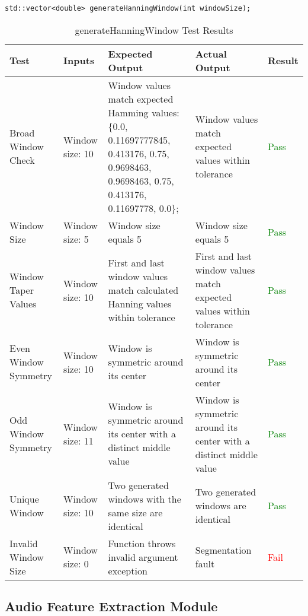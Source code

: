 \documentclass[12pt, titlepage]{article}
\begin{document}
\noindent\texttt{std::vector<double> generateHanningWindow(int windowSize);}\\
\begin{longtable}{|L{3cm}|L{3cm}|L{2.5cm}|L{2.5cm}|l|}
  \caption{generateHanningWindow Test Results} \\
  \hline
  \textbf{Test} & \textbf{Inputs} & \textbf{Expected Output} & \textbf{Actual Output} & \textbf{Result} \\
  \hline
  Broad Window Check &
    Window size: 10 &
    Window values match expected Hamming values: \{0.0, 0.11697777845, 0.413176, 0.75, 0.9698463, 
    0.9698463, 0.75, 0.413176, 0.11697778, 0.0\}; &
    Window values match expected values within tolerance &
    \textcolor{green}{Pass} \\
  \hline
  Window Size &
    Window size: 5 &
    Window size equals 5 &
    Window size equals 5 &
    \textcolor{green}{Pass} \\
  \hline
  Window Taper Values &
    Window size: 10 &
    First and last window values match calculated Hanning values within tolerance &
    First and last window values match expected values within tolerance &
    \textcolor{green}{Pass} \\
  \hline
  Even Window Symmetry &
    Window size: 10 &
    Window is symmetric around its center &
    Window is symmetric around its center &
    \textcolor{green}{Pass} \\
  \hline
  Odd Window Symmetry &
    Window size: 11 &
    Window is symmetric around its center with a distinct middle value &
    Window is symmetric around its center with a distinct middle value &
    \textcolor{green}{Pass} \\
  \hline
  Unique Window &
    Window size: 10 &
    Two generated windows with the same size are identical &
    Two generated windows are identical &
    \textcolor{green}{Pass} \\
  \hline
  Invalid Window Size &
    Window size: 0 &
    Function throws invalid argument exception &
    Segmentation fault &
    \textcolor{red}{Fail} \\
  \hline
\end{longtable}

\subsection{Audio Feature Extraction Module}
\end{document}
